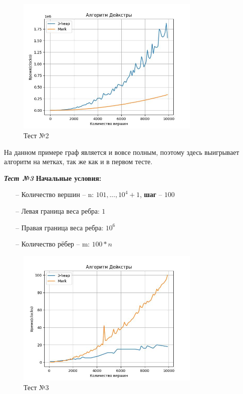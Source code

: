 \begin{text}
\begin{center}
\end{center}
\begin{figure}[h]
  \centering
  \includegraphics[width=0.8\textwidth]{pictures/2.jpeg}
  \caption{Тест №2}
  \label{fig:pict_2}
\end{figure}

На данном примере граф является и вовсе полным, поэтому здесь выигрывает алгоритм на метках, так же как и в первом тесте.\\
\newpage
\begin{center}
\textbf{\textit{Тест №3}}
\textbf{Начальные условия:}

\begin{enumerate}
	\item[--] Количество вершин -- n: $101,...,10^4 + 1$, \textbf{шаг} -- $100$
	\item[--] Левая граница веса ребра: $1$
	\item[--] Правая граница веса ребра: $10^6$
	\item[--] Количество рёбер -- m: $100*n$ 
\end{enumerate}

\end{center}
\begin{figure}[h]
  \centering
  \includegraphics[width=0.8\textwidth]{pictures/3.jpeg}
  \caption{Тест №3}
  \label{fig:pict_3}
\end{figure}


\end{text}
